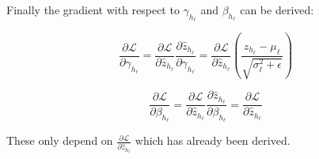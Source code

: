 Finally the gradient with respect to $\gamma_{h_\ell}$ and $\beta_{h_\ell}$ can be derived:

\begin{equation}
\frac{\partial \mathcal{L}}{\partial \gamma_{h_\ell}} = \frac{\partial \mathcal{L}}{\partial \hat{z}_{h_\ell}} \frac{\partial \hat{z}_{h_\ell}}{\partial \gamma_{h_\ell}} = \frac{\partial \mathcal{L}}{\partial \hat{z}_{h_\ell}} \left(\frac{z_{h_\ell} - \mu_\ell}{\sqrt{\sigma_\ell^2 + \epsilon}}\right)
\end{equation}

\begin{equation}
\frac{\partial \mathcal{L}}{\partial \beta_{h_\ell}} = \frac{\partial \mathcal{L}}{\partial \hat{z}_{h_\ell}} \frac{\partial \hat{z}_{h_\ell}}{\partial \beta_{h_\ell}} = \frac{\partial \mathcal{L}}{\partial \hat{z}_{h_\ell}}
\end{equation}

These only depend on $\frac{\partial \mathcal{L}}{\partial \hat{z}_{h_\ell}}$ which has already been derived.